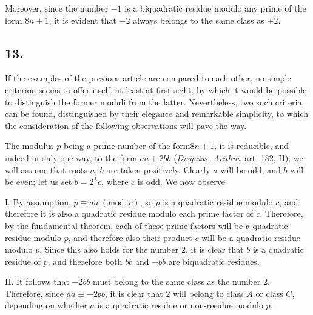 \documentclass[twoside,12pt]{memoir}
\renewcommand{\pmod}[1]{\;(\textrm{mod.}\;#1)}
\begin{document}
Moreover, since the number \(-1\) is a biquadratic residue modulo any prime of the form \(8n+1\), it is evident that \(-2\) always belongs to the same class as \(+2\).
%

\subsection*{13.}

If the examples of the previous article are compared to each other, no simple criterion seems to offer itself, at least at first sight, by which it would be possible to distinguish the former moduli from the latter.  Nevertheless, two such criteria can be found, distinguished by their elegance and remarkable simplicity, to which the consideration of the following observations will pave the way.
%

The modulus \(p\) being a prime number of the form\(8 n+1\), it is reducible, and indeed in only one way, to the form \(a a+2 b b\) (\textit{Disquiss. Arithm.} art. 182, II); we will assume that roots \(a\), \(b\) are taken positively. Clearly \(a\) will be odd, and \(b\) will be even; let us set \(b=2^{\lambda} c\), where \(c\) is odd.  We now observe

I. By assumption, \(p \equiv a a \pmod{{c}}\), so \(p\) is a quadratic residue modulo \(c\), and therefore it is also a quadratic residue modulo each prime factor of \(c\).  Therefore, by the fundamental theorem, each of these prime factors will be a quadratic residue modulo \(p\), and therefore also their product \(c\) will be a quadratic residue modulo \(p\). Since this also holds for the number \(2\), it is clear that \(b\) is a quadratic residue of \(p\), and therefore both \(b b\) and \(-b b\) are biquadratic residues.

II. It follows that \(-2 b b\) must belong to the same class as the number \(2\).  Therefore, since \(a a \equiv-2 b b\), it is clear that \(2\) will belong to class \(A\) or class \(C\), depending on whether \(a\) is a quadratic residue or non-residue modulo \(p\).
\end{document}
